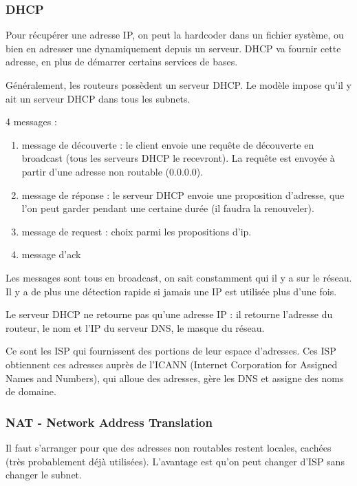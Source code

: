 		
	
		\subsubsection{DHCP}
	
		Pour récupérer une adresse IP, on peut la hardcoder dans un fichier système, ou bien en adresser une dynamiquement depuis un serveur. DHCP va fournir cette adresse, en plus de démarrer certains services de bases.
	
		Généralement, les routeurs possèdent un serveur DHCP. Le modèle impose qu'il y ait un serveur DHCP dans tous les subnets.
	
		4 messages : 
	
	
		\begin{enumerate}
			\item message de découverte : le client envoie une requête de découverte en broadcast (tous les serveurs DHCP le recevront). La requête est envoyée à partir d'une adresse non routable (0.0.0.0).
			\item message de réponse : le serveur DHCP envoie une proposition d'adresse, que l'on peut garder pendant une certaine durée (il faudra la renouveler).
			\item message de request : choix parmi les propositions d'ip.
			\item message d'ack
		\end{enumerate}
	
		Les messages sont tous en broadcast, on sait constamment qui il y a sur le réseau. Il y a de plus une détection rapide si jamais une IP est utilisée plus d'une fois.
		
		Le serveur DHCP ne retourne pas qu'une adresse IP : il retourne l'adresse du routeur, le nom et l'IP du serveur DNS, le masque du réseau.
	
		Ce sont les ISP qui fournissent des portions de leur espace d'adresses. Ces ISP obtiennent ces adresses auprès de l'ICANN (Internet Corporation for Assigned Names and Numbers), qui alloue des adresses, gère les DNS et assigne des noms de domaine.
		

		\subsubsection{NAT - Network Address Translation}
	
		Il faut s'arranger pour que des adresses non routables restent locales, cachées (très probablement déjà utilisées). L'avantage est qu'on peut changer d'ISP sans changer le subnet.
		

